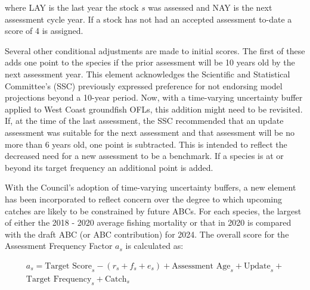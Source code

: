 \documentclass[11pt,
  english,
  a4paper,
]{article}
\begin{document}
\leavevmode\tagmcend\tagstructend\par


where LAY is the last year the stock {\(s\)\leavevmode\tagmcend\tagstructend} was assessed and NAY is the next assessment cycle year. If a stock has not had an accepted assessment to-date a score of 4 is assigned.

\leavevmode\tagmcend\tagstructend\par


Several other conditional adjustments are made to initial scores. The first of these adds one point to the species if the prior assessment will be 10 years old by the next assessment year. This element acknowledges the Scientific and Statistical Committee's (SSC) previously expressed preference for not endorsing model projections beyond a 10-year period. Now, with a time-varying uncertainty buffer applied to West Coast groundfish OFLs, this addition might need to be revisited. If, at the time of the last assessment, the SSC recommended that an update assessment was suitable for the next assessment and that assessment will be no more than 6 years old, one point is subtracted. This is intended to reflect the decreased need for a new assessment to be a benchmark. If a species is at or beyond its target frequency an additional point is added.

\leavevmode\tagmcend\tagstructend\par


With the Council's adoption of time-varying uncertainty buffers, a new element has been incorporated to reflect concern over the degree to which upcoming catches are likely to be constrained by future ABCs. For each species, the largest of either the 2018 - 2020 average fishing mortality or that in 2020 is compared with the draft ABC (or ABC contribution) for 2024. The overall score for the Assessment Frequency Factor {\(a_s\)\leavevmode\tagmcend\tagstructend} is calculated as:

\leavevmode\tagmcend\tagstructend\par


{\[
\begin{aligned}
a_s = \text{Target Score}_s - (r_s + f_s + e_s) + \text{Assessment Age}_s + \text{Update}_s + \\
\text{Target Frequency}_s + \text{Catch}_s
\end{aligned}
\]\leavevmode\tagmcend\tagstructend}
\end{document}
